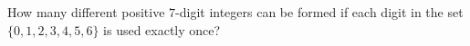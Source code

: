 How many different positive $7$-digit integers can be formed if each digit in the set $\{0,1,2,3,4,5,6\}$ is used exactly once?
